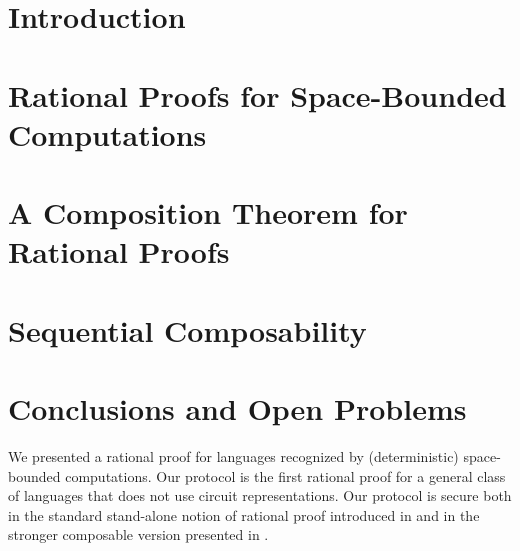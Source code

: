 	
	\section{Introduction}
	
	
	
	
	
	
	\section{Rational Proofs for Space-Bounded Computations }
	
	
	\section{A Composition Theorem for Rational Proofs}
	
	
	
	
	
	\section{Sequential Composability}
	\label{sec:proofs-seq-comp}
	
	
	
	
	
	
	
	
	
	
	
	\section{Conclusions and Open Problems}
	We presented a rational proof for languages recognized by (deterministic) 
	space-bounded computations. Our protocol is the first rational proof for a general class of languages that does not use circuit representations. Our protocol is secure both in the standard stand-alone notion of rational proof introduced in 
	\cite{am} and in the stronger composable version presented in \cite{cg15}. 
	

